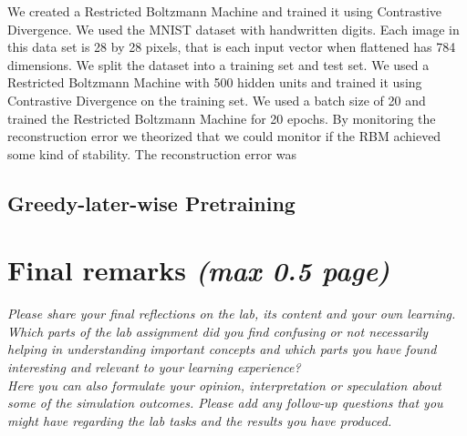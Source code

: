 \documentclass[a4paper]{article}
\begin{document}
We created a Restricted Boltzmann Machine and trained it using Contrastive Divergence. We used the MNIST dataset with handwritten digits. Each image in this data set is 28 by 28 pixels, that is each input vector when flattened has 784 dimensions. We split the dataset into a training set and test set. We used a Restricted Boltzmann Machine with 500 hidden units and trained it using Contrastive Divergence on the training set. We used a batch size of 20 and trained the Restricted Boltzmann Machine for 20 epochs. By monitoring the reconstruction error we theorized that we could monitor if the RBM achieved some kind of stability. The reconstruction error was 

\subsection{Greedy-later-wise Pretraining}
\label{part2}


\section{Final remarks \normalsize{\textit{(max 0.5 page)}}}
\textit{Please share your final reflections on the lab, its content and your own learning. Which parts of the lab assignment did you find confusing or not necessarily helping in understanding important concepts and which parts you have found interesting and relevant to your learning experience? \\
Here you can also formulate your opinion, interpretation or speculation about some of the simulation outcomes. Please add any follow-up questions that you might have regarding the lab tasks and the results you have produced.}

\printbibliography
\end{document}
